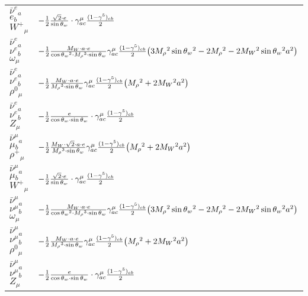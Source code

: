\begin{center}
\begin{tabular}{|l|l|}
$\bar{\nu}^e{}_{a }$ \phantom{-} $e{}_{b }$ \phantom{-} $W^+{}_{\mu }$ \phantom{-}  &
	$-\frac{1}{2}\frac{\sqrt{2} \cdot e}{ \sin{\theta}_w}\cdot \gamma_{a c}^\mu {(1-\gamma^5)_{c b}\over 2} $\\[2mm]
$\bar{\nu}^e{}_{a }$ \phantom{-} $\nu^e{}_{b }$ \phantom{-} $\omega{}_{\mu }$ \phantom{-}  &
	$-\frac{1}{2}\frac{ M_W \cdot a \cdot e}{ \cos{\theta}_w{}^2  \cdot M_\rho{}^3  \cdot \sin{\theta}_w}\gamma_{a c}^\mu {(1-\gamma^5)_{c b}\over 2} \big(3 M_\rho{}^2  \sin{\theta}_w{}^2 -2 M_\rho{}^2 -2 M_W{}^2  \sin{\theta}_w{}^2  a{}^2 \big)$\\[2mm]
$\bar{\nu}^e{}_{a }$ \phantom{-} $\nu^e{}_{b }$ \phantom{-} $\rho^0{}_{\mu }$ \phantom{-}  &
	$-\frac{1}{2}\frac{ M_W \cdot a \cdot e}{ M_\rho{}^3  \cdot \sin{\theta}_w}\gamma_{a c}^\mu {(1-\gamma^5)_{c b}\over 2} \big( M_\rho{}^2 +2 M_W{}^2  a{}^2 \big)$\\[2mm]
$\bar{\nu}^e{}_{a }$ \phantom{-} $\nu^e{}_{b }$ \phantom{-} ${Z}_{\mu }$ \phantom{-}  &
	$-\frac{1}{2}\frac{ e}{ \cos{\theta}_w \cdot \sin{\theta}_w}\cdot \gamma_{a c}^\mu {(1-\gamma^5)_{c b}\over 2} $\\[2mm]
$\bar{\nu}^\mu{}_{a }$ \phantom{-} $\mu{}_{b }$ \phantom{-} $\rho^+{}_{\mu }$ \phantom{-}  &
	$-\frac{1}{2}\frac{ M_W \cdot\sqrt{2} \cdot a \cdot e}{ M_\rho{}^3  \cdot \sin{\theta}_w}\gamma_{a c}^\mu {(1-\gamma^5)_{c b}\over 2} \big( M_\rho{}^2 +2 M_W{}^2  a{}^2 \big)$\\[2mm]
$\bar{\nu}^\mu{}_{a }$ \phantom{-} $\mu{}_{b }$ \phantom{-} $W^+{}_{\mu }$ \phantom{-}  &
	$-\frac{1}{2}\frac{\sqrt{2} \cdot e}{ \sin{\theta}_w}\cdot \gamma_{a c}^\mu {(1-\gamma^5)_{c b}\over 2} $\\[2mm]
$\bar{\nu}^\mu{}_{a }$ \phantom{-} $\nu^\mu{}_{b }$ \phantom{-} $\omega{}_{\mu }$ \phantom{-}  &
	$-\frac{1}{2}\frac{ M_W \cdot a \cdot e}{ \cos{\theta}_w{}^2  \cdot M_\rho{}^3  \cdot \sin{\theta}_w}\gamma_{a c}^\mu {(1-\gamma^5)_{c b}\over 2} \big(3 M_\rho{}^2  \sin{\theta}_w{}^2 -2 M_\rho{}^2 -2 M_W{}^2  \sin{\theta}_w{}^2  a{}^2 \big)$\\[2mm]
$\bar{\nu}^\mu{}_{a }$ \phantom{-} $\nu^\mu{}_{b }$ \phantom{-} $\rho^0{}_{\mu }$ \phantom{-}  &
	$-\frac{1}{2}\frac{ M_W \cdot a \cdot e}{ M_\rho{}^3  \cdot \sin{\theta}_w}\gamma_{a c}^\mu {(1-\gamma^5)_{c b}\over 2} \big( M_\rho{}^2 +2 M_W{}^2  a{}^2 \big)$\\[2mm]
$\bar{\nu}^\mu{}_{a }$ \phantom{-} $\nu^\mu{}_{b }$ \phantom{-} ${Z}_{\mu }$ \phantom{-}  &
	$-\frac{1}{2}\frac{ e}{ \cos{\theta}_w \cdot \sin{\theta}_w}\cdot \gamma_{a c}^\mu {(1-\gamma^5)_{c b}\over 2} $\\[2mm]

\end{tabular}
\end{center}
